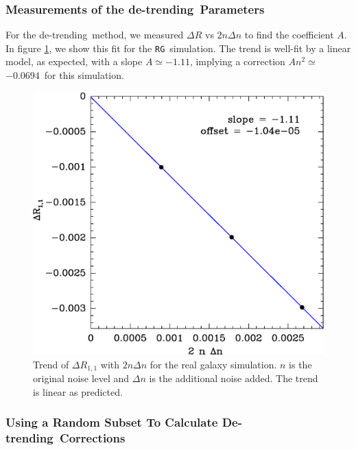 \documentclass[a4paper,fleqn,usenatbib]{mnras}
\newcommand{\detrend}{de-trending}
\newcommand{\Detrend}{De-trending}
\newcommand{\Aslope}{$-1.11$}
\newcommand{\Rcorr}{$-0.0694$}
\newcommand{\rgsim}{\texttt{RG}}
\begin{document}
\subsubsection{Measurements of the \detrend\ Parameters}

For the \detrend\ method, we measured $\Delta R$ vs $2 n \Delta n$ to find the
coefficient $A$.  In figure \ref{fig:detrend}, we show this fit for the \rgsim\
simulation.  The trend is well-fit by a linear model, as expected, with a slope
$A \simeq $\Aslope, implying a correction $A n^2 \simeq$ \Rcorr\ for this
simulation.

\begin{figure}
	\centering
    \includegraphics[width=\columnwidth]{mcal-v14s01-Rnoise-detrend-R11.eps}

    \caption{Trend of $\Delta R_{1,1}$ with $2 n \Delta n$ for the
        real galaxy simulation.   $n$ is the
    original noise level and $\Delta n$ is the additional noise added.  The
    trend is linear as predicted.}

\label{fig:detrend}
\end{figure}




\subsubsection{Using a Random Subset To Calculate \Detrend\ Corrections}
\end{document}
